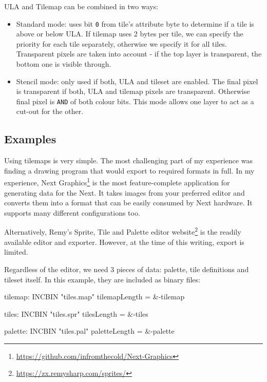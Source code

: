 ULA and Tilemap can be combined in two ways:

\begin{itemize}[topsep=1pt,itemsep=1pt]
	\item Standard mode: uses bit {\tt 0} from tile's attribute byte to determine if a tile is above or below ULA. If tilemap uses 2 bytes per tile, we can specify the priority for each tile separately, otherwise we specify it for all tiles. Transparent pixels are taken into account - if the top layer is transparent, the bottom one is visible through.
	
	\item Stencil mode: only used if both, ULA and tileset are enabled. The final pixel is transparent if both, ULA and tilemap pixels are transparent. Otherwise final pixel is {\tt AND} of both colour bits. This mode allows one layer to act as a cut-out for the other.
\end{itemize}


\subsection{Examples}

Using tilemaps is very simple. The most challenging part of my experience was finding a drawing program that would export to required formats in full. In my experience, Next Graphics\footnote{\url{https://github.com/infromthecold/Next-Graphics}} is the most feature-complete application for generating data for the Next. It takes images from your preferred editor and converts them into a format that can be easily consumed by Next hardware. It supports many different configurations too.

Alternatively, Remy's Sprite, Tile and Palette editor website\footnote{\url{https://zx.remysharp.com/sprites/}} is the readily available editor and exporter. However, at the time of this writing, export is limited.

Regardless of the editor, we need 3 pieces of data: palette, tile definitions and tileset itself. In this example, they are included as binary files:

\begin{tcblisting}{}
tilemap:
	INCBIN "tiles.map"
tilemapLength = &-tilemap

tiles:
	INCBIN "tiles.spr"
tilesLength = &-tiles

palette:
	INCBIN "tiles.pal"
paletteLength = &-palette
\end{tcblisting}


